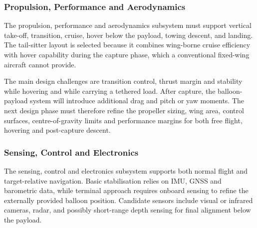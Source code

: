 \subsubsection{Propulsion, Performance and Aerodynamics}
\label{subsubsec:concept_a_prop_perf_aero}


The propulsion, performance and aerodynamics subsystem must support vertical take-off, transition, cruise, hover below the payload, towing descent, and landing. The tail-sitter layout is selected because it combines wing-borne cruise efficiency with hover capability during the capture phase, which a conventional fixed-wing aircraft cannot provide.

The main design challenges are transition control, thrust margin and stability while hovering and while carrying a tethered load. After capture, the balloon-payload system will introduce additional drag and pitch or yaw moments. The next design phase must therefore refine the propeller sizing, wing area, control surfaces, centre-of-gravity limits and performance margins for both free flight, hovering and post-capture descent.






\subsubsection{Sensing, Control and Electronics}
\label{subsubsec:concept_a_sce}





The sensing, control and electronics subsystem supports both normal flight and target-relative navigation. Basic stabilisation relies on IMU, GNSS and barometric data, while terminal approach requires onboard sensing to refine the externally provided balloon position. Candidate sensors include visual or infrared cameras, radar, and possibly short-range depth sensing for final alignment below the payload.

